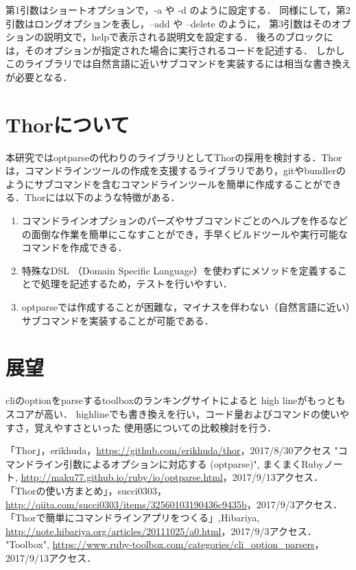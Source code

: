 \documentclass[a4j,twocolumn]{jsarticle}
\begin{document}
第1引数はショートオプションで，-a や -d のように設定する．
同様にして，第2引数はロングオプションを表し，--add や --delete のように，
第3引数はそのオプションの説明文で，helpで表示される説明文を設定する．
後ろのブロックには，そのオプションが指定された場合に実行されるコードを記述する\cite{MakuMakuOptParse}．
しかしこのライブラリでは自然言語に近いサブコマンドを実装するには相当な書き換えが必要となる．

\section{Thorについて}
本研究ではoptparseの代わりのライブラリとしてThorの採用を検討する．Thorは，コマンドラインツールの作成を支援するライブラリであり，gitやbundlerのようにサブコマンドを含むコマンドラインツールを簡単に作成することができる\cite{succi}．Thorには以下のような特徴がある．

\begin{enumerate}
\item コマンドラインオプションのパーズやサブコマンドごとのヘルプを作るなどの面倒な作業を簡単にこなすことができ，手早くビルドツールや実行可能なコマンドを作成できる\cite{hibariya}．
\item 特殊なDSL （Domain Specific Language）を使わずにメソッドを定義することで処理を記述するため，テストを行いやすい\cite{hibariya}．
\item optparseでは作成することが困難な，マイナスを伴わない（自然言語に近い）サブコマンドを実装することが可能である．
\end{enumerate}

\section{展望}
cliのoptionをparseするtoolboxのランキングサイトによると
high
lineがもっともスコアが高い\cite{toolbox}．
highlineでも書き換えを行い，コード量およびコマンドの使いやすさ，覚えやすさといった
使用感についての比較検討を行う．

\vspace{0.3\baselineskip}

{\small\setlength\baselineskip{10pt}	%
\begin{thebibliography}{9}
「Thor」，erikhuda，\url{https://github.com/erikhuda/thor}，2017/8/30アクセス
"コマンドライン引数によるオプションに対応する (optparse)", まくまくRubyノート, \url{http://maku77.github.io/ruby/io/optparse.html}，2017/9/13アクセス．
「Thorの使い方まとめ」，succi0303，\url{http://qiita.com/succi0303/items/32560103190436c9435b}，2017/9/3アクセス．
「Thorで簡単にコマンドラインアプリをつくる」,Hibariya, \url{http://note.hibariya.org/articles/20111025/a0.html}，2017/9/3アクセス．
 "Toolbox", \url{https://www.ruby-toolbox.com/categories/cli_option_parsers}，2017/9/13アクセス．
\end{thebibliography}
}
\end{document}
